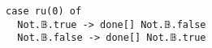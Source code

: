 \begin{verbatim}
case ru(0) of
  Not.𝔹.true -> done[] Not.𝔹.false
  Not.𝔹.false -> done[] Not.𝔹.true
\end{verbatim}
